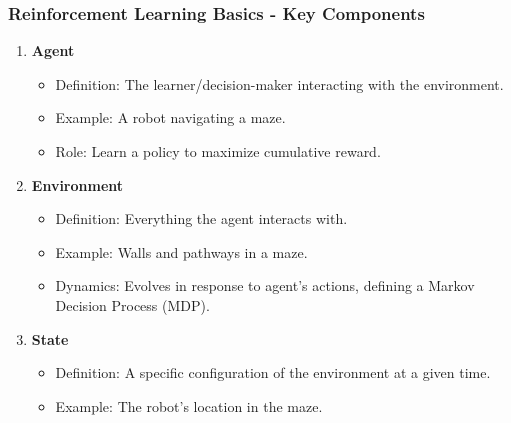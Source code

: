 \documentclass{beamer}
\begin{document}
\begin{frame}[fragile]
    \frametitle{Reinforcement Learning Basics - Key Components}
    \begin{enumerate}
        \item \textbf{Agent}
            \begin{itemize}
                \item Definition: The learner/decision-maker interacting with the environment.
                \item Example: A robot navigating a maze.
                \item Role: Learn a policy to maximize cumulative reward.
            \end{itemize}
        
        \item \textbf{Environment}
            \begin{itemize}
                \item Definition: Everything the agent interacts with.
                \item Example: Walls and pathways in a maze.
                \item Dynamics: Evolves in response to agent's actions, defining a Markov Decision Process (MDP).
            \end{itemize}
        
        \item \textbf{State}
            \begin{itemize}
                \item Definition: A specific configuration of the environment at a given time.
                \item Example: The robot's location in the maze.
            \end{itemize}
    \end{enumerate}
\end{frame}
\end{document}
